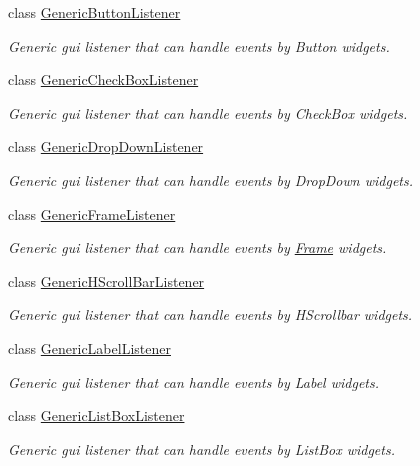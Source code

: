 \begin{DoxyCompactItemize}
class \mbox{\hyperlink{classec_1_1_generic_button_listener}{Generic\+Button\+Listener}}
\begin{DoxyCompactList}\small\item\em Generic gui listener that can handle events by Button widgets. \end{DoxyCompactList}\item 
class \mbox{\hyperlink{classec_1_1_generic_check_box_listener}{Generic\+Check\+Box\+Listener}}
\begin{DoxyCompactList}\small\item\em Generic gui listener that can handle events by Check\+Box widgets. \end{DoxyCompactList}\item 
class \mbox{\hyperlink{classec_1_1_generic_drop_down_listener}{Generic\+Drop\+Down\+Listener}}
\begin{DoxyCompactList}\small\item\em Generic gui listener that can handle events by Drop\+Down widgets. \end{DoxyCompactList}\item 
class \mbox{\hyperlink{classec_1_1_generic_frame_listener}{Generic\+Frame\+Listener}}
\begin{DoxyCompactList}\small\item\em Generic gui listener that can handle events by \mbox{\hyperlink{classec_1_1_frame}{Frame}} widgets. \end{DoxyCompactList}\item 
class \mbox{\hyperlink{classec_1_1_generic_h_scroll_bar_listener}{Generic\+H\+Scroll\+Bar\+Listener}}
\begin{DoxyCompactList}\small\item\em Generic gui listener that can handle events by H\+Scrollbar widgets. \end{DoxyCompactList}\item 
class \mbox{\hyperlink{classec_1_1_generic_label_listener}{Generic\+Label\+Listener}}
\begin{DoxyCompactList}\small\item\em Generic gui listener that can handle events by Label widgets. \end{DoxyCompactList}\item 
class \mbox{\hyperlink{classec_1_1_generic_list_box_listener}{Generic\+List\+Box\+Listener}}
\begin{DoxyCompactList}\small\item\em Generic gui listener that can handle events by List\+Box widgets. \end{DoxyCompactList}\item 

\end{DoxyCompactItemize}
